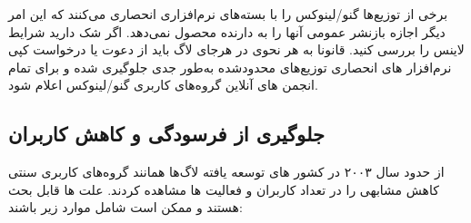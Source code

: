 
\begin{caveat}
برخی از توزیع‌ها گنو/لینوکس را با بسته‌های نرم‌افزاری انحصاری  می‌کنند که این امر
دیگر اجازه بازنشر عمومی آنها را به دارنده محصول نمی‌دهد. اگر شک دارید شرایط لاینس را بررسی کنید.
قانونا به هر نحوی در هرجای لاگ باید از دعوت یا درخواست کپی نرم‌افزار های انحصاری توزیع‌های محدودشده
 به‌طور جدی جلوگیری شده و برای تمام انجمن های آنلاین گروه‌های کاربری گنو/لینوکس  اعلام شود.
\end{caveat}




\subsection{جلوگیری از فرسودگی و کاهش کاربران}

از حدود سال ۲۰۰۳ در کشور های توسعه یافته لاگ‌ها همانند گروه‌های کاربری سنتی
کاهش مشابهی را در تعداد کاربران و فعالیت ها مشاهده کردند. علت ها قابل بحث هستند
و ممکن است شامل موارد زیر باشند:


